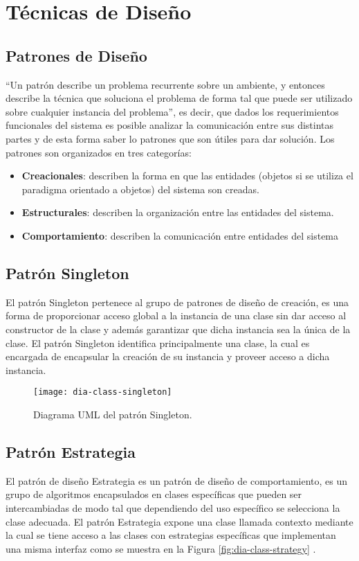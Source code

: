 \chapter{Técnicas de Diseño}\label{sec-patrones}

\section{Patrones de Diseño}
``Un patrón describe un problema recurrente sobre un ambiente, y entonces describe la técnica que soluciona el problema de forma tal que puede ser utilizado sobre cualquier instancia del problema''\cite{DesignPatterns}, es decir, que dados los requerimientos funcionales del sistema es posible analizar la comunicación entre sus distintas partes y de esta forma saber lo patrones que son útiles para dar solución. Los patrones son organizados en tres categorías\cite{DesignPatterns}:
\begin{itemize}
	\item \textbf{Creacionales}: describen la forma en que las entidades (objetos si se utiliza el paradigma orientado a objetos) del sistema son creadas.
	\item \textbf{Estructurales}: describen la organización entre las entidades del sistema.
	\item \textbf{Comportamiento}: describen la comunicación entre entidades del sistema
\end{itemize}

\section{Patrón Singleton}\label{sec-singleton}
El patrón Singleton pertenece al grupo de patrones de diseño de creación, es una forma de proporcionar acceso global a la instancia de una clase sin dar acceso al constructor de la clase y además garantizar que dicha instancia sea la única de la clase. El patrón Singleton identifica principalmente una clase, la cual es encargada de encapsular la creación de su instancia y proveer acceso a dicha instancia\cite{DesignPatternsLasater, DesignPatterns, OCPJavaSE7}.

\begin{figure}[h]
  \centering
  \texttt{[image: dia-class-singleton]}
  \caption{Diagrama UML del patrón Singleton\cite{DesignPatternsLasater}.}
  \label{fig:dia-class-singleton}
\end{figure}

\section{Patrón Estrategia}\label{sec-strategy}
El patrón de diseño Estrategia es un patrón de diseño de comportamiento, es un grupo de algoritmos encapsulados en clases específicas que pueden ser intercambiadas de modo tal que dependiendo del uso específico se selecciona la clase adecuada. El patrón Estrategia expone una clase llamada contexto mediante la cual se tiene acceso a las clases con estrategias específicas que implementan una misma interfaz como se muestra en la Figura \ref{fig:dia-class-strategy} \cite{DesignPatternsLasater, DesignPatterns}.


